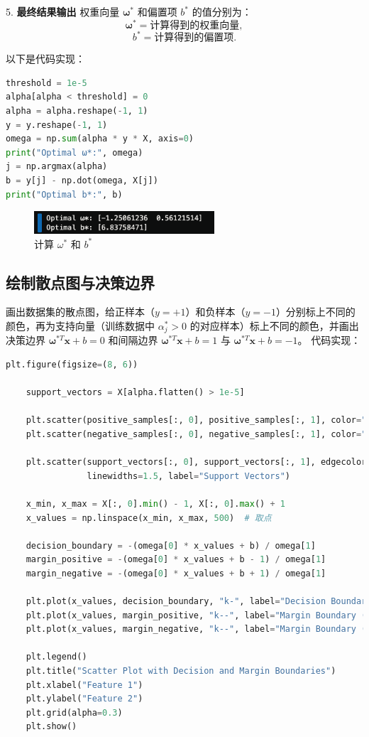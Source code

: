 \documentclass[12pt,a4paper,oneside]{article}
\begin{document}
5.\textbf{ 最终结果输出  }
   权重向量 $\pmb{\omega}^*$ 和偏置项 $b^*$ 的值分别为：
   \[
   \pmb{\omega}^* = \text{计算得到的权重向量},
   \]
   \[
   b^* = \text{计算得到的偏置项}.
   \]

以下是代码实现：
\begin{lstlisting}[language=Python, caption=计算 $\omega^*$ 和 $b^*$]
threshold = 1e-5
alpha[alpha < threshold] = 0  
alpha = alpha.reshape(-1, 1)  
y = y.reshape(-1, 1)     
omega = np.sum(alpha * y * X, axis=0)  
print("Optimal ω*:", omega)
j = np.argmax(alpha)  
b = y[j] - np.dot(omega, X[j])  
print("Optimal b*:", b)
\end{lstlisting}

\begin{figure}[H]
    \centering
    \includegraphics[width=0.6\textwidth]{image/7.png}
    \caption{计算 $\omega^*$ 和 $b^*$}
\end{figure}
\subsection{绘制散点图与决策边界}
画出数据集的散点图，给正样本（$y = +1$）和负样本（$y = -1$）分别标上不同的颜色，再为支持向量（训练数据中 $\alpha_j^* > 0$ 的对应样本）标上不同的颜色，并画出决策边界 $\bm{\omega}^{*T} \bm{x} + b = 0$ 和间隔边界 $\bm{\omega}^{*T} \bm{x} + b = 1$ 与 $\bm{\omega}^{*T} \bm{x} + b = -1$。
代码实现：
\begin{lstlisting}[language=Python, caption=绘制散点图与决策边界]
    plt.figure(figsize=(8, 6))
    
    support_vectors = X[alpha.flatten() > 1e-5]  
    
    plt.scatter(positive_samples[:, 0], positive_samples[:, 1], color="blue", label="Positive Samples (y=+1)", alpha=0.6)
    plt.scatter(negative_samples[:, 0], negative_samples[:, 1], color="red", label="Negative Samples (y=-1)", alpha=0.6)
    
    plt.scatter(support_vectors[:, 0], support_vectors[:, 1], edgecolors="green", facecolors="none",
                linewidths=1.5, label="Support Vectors")
    
    x_min, x_max = X[:, 0].min() - 1, X[:, 0].max() + 1
    x_values = np.linspace(x_min, x_max, 500)  # 取点
    
    decision_boundary = -(omega[0] * x_values + b) / omega[1]
    margin_positive = -(omega[0] * x_values + b - 1) / omega[1]
    margin_negative = -(omega[0] * x_values + b + 1) / omega[1]
    
    plt.plot(x_values, decision_boundary, "k-", label="Decision Boundary (w*x + b = 0)")
    plt.plot(x_values, margin_positive, "k--", label="Margin Boundary (w*x + b = +1)")
    plt.plot(x_values, margin_negative, "k--", label="Margin Boundary (w*x + b = -1)")
    
    plt.legend()
    plt.title("Scatter Plot with Decision and Margin Boundaries")
    plt.xlabel("Feature 1")
    plt.ylabel("Feature 2")
    plt.grid(alpha=0.3)
    plt.show()
    
\end{lstlisting}
\end{document}
